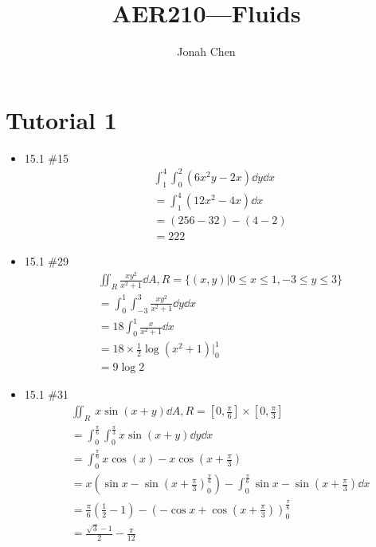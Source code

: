 \documentclass[a4paper]{article}
\title{AER210---Fluids}
\author{Jonah Chen}
\numberwithin{equation}{section}
\begin{document}
\maketitle
\tableofcontents

\section{Tutorial 1}

\begin{itemize}
    \item 15.1 \#15
    \begin{align}
        &\int_1^4\int_0^2(6x^2y-2x)\dd y\dd x\\
        &=\int_1^4(12x^2-4x)\dd x\\
        &=(256-32)-(4-2)\\
        &=222
    \end{align}
    \item 15.1 \#29
    \begin{align}
        &\iint_R \frac{xy^2}{x^2+1}\dd A, R=\{(x,y)|0\leq x\leq 1, -3\leq y\leq 3\}\\
        &=\int_0^1\int_{-3}^3\frac{xy^2}{x^2+1}\dd y\dd x\\
        &=18\int_0^1\frac{x}{x^2+1}\dd x\\
        &=18\times \frac{1}{2}\log(x^2+1)\Bigg|_0^1\\
        &=9\log 2
    \end{align}
    \item 15.1 \#31
    \begin{align}
        &\iint_R\ x\sin(x+y)\dd A, R=[0,\frac{\pi}{6}]\times[0,\frac{\pi}{3}]\\
        &=\int_0^{\frac{\pi}{6}}\int_0^{\frac{\pi}{3}}x\sin(x+y)\dd y\dd x\\
        &=\int_0^{\frac{\pi}{6}}x\cos(x)-x\cos(x+\frac{\pi}{3})\\
        &=x\left(\sin x-\sin(x+\frac{\pi}{3})_0^{\frac{\pi}{6}}\right)-\int_0^{\frac{\pi}{6}}\sin x-\sin(x+\frac{\pi}{3})\dd x\\
        &=\frac{\pi}{6}(\frac{1}{2}-1)-\left(-\cos x+\cos(x+\frac{\pi}{3})\right)_0^{\frac{\pi}{6}}\\
        &=\frac{\sqrt 3-1}{2}-\frac{\pi}{12}
    \end{align}

\end{itemize}
\end{document}
